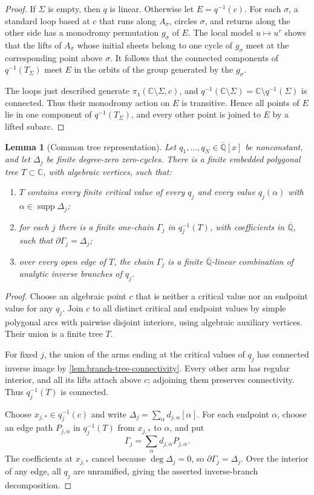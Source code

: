 \documentclass[11pt]{article}
\numberwithin{equation}{section}
\newtheorem{lemma}[lemma]{Lemma}
\theoremstyle{definition}
\theoremstyle{remark}
\newcommand{\C}{\mathbb C}
\newcommand{\Qbar}{\overline{\mathbb Q}}
\newcommand{\supp}{\operatorname{supp}}
\begin{document}
\begin{proof}
If $\Sigma$ is empty, then $q$ is linear.  Otherwise let
$E=q^{-1}(c)$.  For each $\sigma$, a standard loop based at $c$ that runs
along $A_\sigma$, circles $\sigma$, and returns along the other side has a
monodromy permutation $g_\sigma$ of $E$.  The local model
$u\mapsto u^r$ shows that the lifts of $A_\sigma$ whose initial sheets
belong to one cycle of $g_\sigma$ meet at the corresponding point above
$\sigma$.  It follows that the connected components of
$q^{-1}(T_\Sigma)$ meet $E$ in the orbits of the group generated by the
$g_\sigma$.

The loops just described generate $\pi_1(\C\setminus\Sigma,c)$, and
$q^{-1}(\C\setminus\Sigma)=\C\setminus q^{-1}(\Sigma)$ is connected.
Thus their monodromy action on $E$ is transitive.  Hence all points of $E$
lie in one component of $q^{-1}(T_\Sigma)$, and every other point is joined
to $E$ by a lifted subarc.
\end{proof}

\begin{lemma}[Common tree representation]
\label{lem:common-tree}
Let $q_1,\ldots,q_N\in\Qbar[x]$ be nonconstant, and let $\Delta_j$ be
finite degree-zero zero-cycles.  There is a finite embedded polygonal tree
$T\subset\C$, with algebraic vertices, such that:
\begin{enumerate}[label=\textup{(\roman*)},leftmargin=2.4em]
\item $T$ contains every finite critical value of every $q_j$ and every
value $q_j(\alpha)$ with $\alpha\in\supp\Delta_j$;
\item for each $j$ there is a finite one-chain $\Gamma_j$ in
$q_j^{-1}(T)$, with coefficients in $\Qbar$, such that
$\partial\Gamma_j=\Delta_j$;
\item over every open edge of $T$, the chain $\Gamma_j$ is a finite
$\Qbar$-linear combination of analytic inverse branches of $q_j$.
\end{enumerate}
\end{lemma}

\begin{proof}
Choose an algebraic point $c$ that is neither a critical value nor an
endpoint value for any $q_j$.  Join $c$ to all distinct critical and
endpoint values by simple polygonal arcs with pairwise disjoint interiors,
using algebraic auxiliary vertices.  Their union is a finite tree $T$.

For fixed $j$, the union of the arms ending at the critical values of
$q_j$ has connected inverse image by
\cref{lem:branch-tree-connectivity}.  Every other arm has regular interior,
and all its lifts attach above $c$; adjoining them preserves connectivity.
Thus $q_j^{-1}(T)$ is connected.

Choose $x_{j,*}\in q_j^{-1}(c)$ and write
$\Delta_j=\sum_\alpha d_{j,\alpha}[\alpha]$.  For each endpoint
$\alpha$, choose an edge path $P_{j,\alpha}$ in $q_j^{-1}(T)$ from
$x_{j,*}$ to $\alpha$, and put
\[
  \Gamma_j=\sum_\alpha d_{j,\alpha}P_{j,\alpha}.
\]
The coefficients at $x_{j,*}$ cancel because $\deg\Delta_j=0$, so
$\partial\Gamma_j=\Delta_j$.  Over the interior of any edge, all $q_j$ are
unramified, giving the asserted inverse-branch decomposition.
\end{proof}
\end{document}
